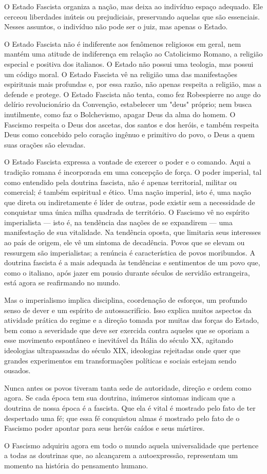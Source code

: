 \documentclass[12pt]{article}
\begin{document}
O Estado Fascista organiza a nação, mas deixa ao indivíduo espaço adequado. Ele cerceou liberdades inúteis ou prejudiciais, preservando aquelas que são essenciais. Nesses assuntos, o indivíduo não pode ser o juiz, mas apenas o Estado.

O Estado Fascista não é indiferente aos fenômenos religiosos em geral, nem mantém uma atitude de indiferença em relação ao Catolicismo Romano, a religião especial e positiva dos italianos. O Estado não possui uma teologia, mas possui um código moral. O Estado Fascista vê na religião uma das manifestações espirituais mais profundas e, por essa razão, não apenas respeita a religião, mas a defende e protege. O Estado Fascista não tenta, como fez Robespierre no auge do delírio revolucionário da Convenção, estabelecer um "deus" próprio; nem busca inutilmente, como faz o Bolchevismo, apagar Deus da alma do homem. O Fascismo respeita o Deus dos ascetas, dos santos e dos heróis, e também respeita Deus como concebido pelo coração ingênuo e primitivo do povo, o Deus a quem suas orações são elevadas.

O Estado Fascista expressa a vontade de exercer o poder e o comando. Aqui a tradição romana é incorporada em uma concepção de força. O poder imperial, tal como entendido pela doutrina fascista, não é apenas territorial, militar ou comercial; é também espiritual e ético. Uma nação imperial, isto é, uma nação que direta ou indiretamente é líder de outras, pode existir sem a necessidade de conquistar uma única milha quadrada de território. O Fascismo vê no espírito imperialista — isto é, na tendência das nações de se expandirem — uma manifestação de sua vitalidade. Na tendência oposta, que limitaria seus interesses ao país de origem, ele vê um sintoma de decadência. Povos que se elevam ou ressurgem são imperialistas; a renúncia é característica de povos moribundos. A doutrina fascista é a mais adequada às tendências e sentimentos de um povo que, como o italiano, após jazer em pousio durante séculos de servidão estrangeira, está agora se reafirmando no mundo.

Mas o imperialismo implica disciplina, coordenação de esforços, um profundo senso de dever e um espírito de autossacrifício. Isso explica muitos aspectos da atividade prática do regime e a direção tomada por muitas das forças do Estado, bem como a severidade que deve ser exercida contra aqueles que se oporiam a esse movimento espontâneo e inevitável da Itália do século XX, agitando ideologias ultrapassadas do século XIX, ideologias rejeitadas onde quer que grandes experimentos em transformações políticas e sociais estejam sendo ousados.

Nunca antes os povos tiveram tanta sede de autoridade, direção e ordem como agora. Se cada época tem sua doutrina, inúmeros sintomas indicam que a doutrina de nossa época é a fascista. Que ela é vital é mostrado pelo fato de ter despertado uma fé; que essa fé conquistou almas é mostrado pelo fato de o Fascismo poder apontar para seus heróis caídos e seus mártires.

O Fascismo adquiriu agora em todo o mundo aquela universalidade que pertence a todas as doutrinas que, ao alcançarem a autoexpressão, representam um momento na história do pensamento humano.
\end{document}

